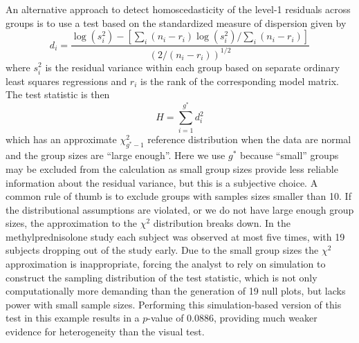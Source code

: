 \documentclass[12pt]{article} %
\newcommand{\al}[1]{{\color{ForestGreen} #1}}
\newcommand{\alnote}[1]{\todo[inline,color=green!40]{#1}} %
\newcommand{\hhnote}[1]{\todo[inline,color=orange!40]{#1}}
\begin{document}
An alternative approach to detect homoscedasticity of the level-1 residuals across groups is to use a test  \citep{Raudenbush:2002} based on the standardized measure of dispersion given by
%
\begin{equation}\label{eq:d}
	d_i = \frac{\log\left( s_i^2 \right) - \left[ \sum_i (n_i - r_i) \log\left( s_i^2 \right) / \sum_i  (n_i - r_i) \right]}{\left(2 / (n_i - r_i)\right)^{1/2}}
\end{equation}
%
where $s_i^2$ is the residual variance within each group based on separate ordinary least squares regressions and $r_i$ is the rank of the corresponding model matrix. The test statistic is then
%
\begin{equation}
	H = \sum_{i=1}^{g^*} d_i^2
\end{equation}
%
which has an approximate $\chi^2_{g^*-1}$ reference distribution when the data are normal and the group sizes are ``large enough''. Here we use $g^*$ because ``small'' groups may be excluded from the calculation as small group sizes provide less reliable information about the residual variance, but this is a subjective choice. A common rule of thumb is to exclude groups with samples sizes smaller than 10. If the distributional assumptions are violated, or we do not have large enough group sizes,  the approximation to the $\chi^2$ distribution breaks down. In the methylprednisolone study each subject was observed at most five times, with 19 subjects dropping out of the study early. Due to the small group sizes the $\chi^2$ approximation is inappropriate, forcing the analyst to rely on simulation to construct the sampling distribution of the test statistic, which is not only computationally more demanding than the generation of 19 null plots, but lacks power with small sample sizes. \al{Performing this simulation-based version of this test in this example results in a $p$-value of 0.0886, providing much weaker evidence for heterogeneity than the visual test. }

%
\end{document}
